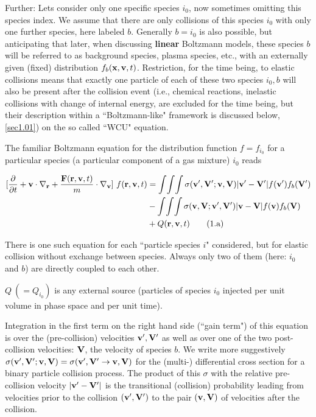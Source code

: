 Further: Lets consider only one specific species $i_0$, now sometimes omitting
this species index.
We assume that there are only collisions of this species $i_0$ with only one
further species, here labeled $b$.
Generally $b=i_0$ is also possible, but anticipating that later, when
discussing \textbf{linear} Boltzmann models, these species $b$ will be referred
to as background species, plasma species, etc., with an externally given
(fixed) distribution $f_b(\mathbf{x},\mathbf{v},t)$.
Restriction, for the time being, to elastic collisions means that exactly one
particle of each of these two species $i_0, b$ will also be present after the
collision event (i.e., chemical reactions, inelastic collisions with change of
internal energy, are excluded for the time being, but their description within
a ``Boltzmann-like" framework is discussed below, \cref{sec1.01}) on the so
called ``\ac{WCU}" equation.

The familiar Boltzmann equation for the distribution function $f=f_{i_0}$ for a
particular species (a particular component of a gas mixture) $i_0$ reads

\begin{align}
  \label{eq1a} \lbrack\frac\partial{\partial t} + \mathbf{v} \cdot
  \nabla_{\mathbf{r}} + \frac{\mathbf{F}(\mathbf{r},\mathbf{v},t)}{m} \cdot \nabla_{\mathbf{v}}\rbrack \
  f(\mathbf{r},\mathbf{v},t) & = \int\!\int\!\int \sigma(\mathbf{v}',\mathbf{V}';\mathbf{v},\mathbf{V}) |\mathbf{v}'-\mathbf{V}'| f(\mathbf{v}')
  f_b(\mathbf{V}') \nonumber                                                             \\
               & -
  \int\!\int\!\int
  \sigma(\mathbf{v},\mathbf{V};\mathbf{v}',\mathbf{V}')
  |\mathbf{v}-\mathbf{V}| f(\mathbf{v}) f_b(\mathbf{V})
  \nonumber
  \\
               & + Q(\mathbf{r},\mathbf{v},t)
  \tag{1.a}
\end{align}

There is one such equation for each ``particle species $i$" considered, but for
elastic collision without exchange between species.
Always only two of them (here: $i_0$ and $b$) are directly coupled to each
other.

$Q \ (= Q_{i_0})$ is any external source (particles of species $i_0$ injected
per unit volume  in phase space and per unit time).

Integration in the first term on the right hand side (``gain term") of this
equation is over the (pre-collision) velocities $\mathbf{v}', \mathbf{V}'$  as well as over
one of the two post-collision velocities: $\mathbf{V}$, the velocity of species $b$.
We write more suggestively  $\sigma(\mathbf{v}',\mathbf{V}'; \mathbf{v},\mathbf{V}) = \sigma(\mathbf{v}',\mathbf{V}'
  \rightarrow \mathbf{v},\mathbf{V})$ for the (multi-) differential cross section for a binary
particle collision process.
The product of this $\sigma$ with the relative pre-collision velocity
$|\mathbf{v}'-\mathbf{V}'|$ is the transitional (collision) probability leading from
velocities prior to the collision $(\mathbf{v}',\mathbf{V}')$ to the pair $(\mathbf{v},\mathbf{V})$ of
velocities after the collision.

